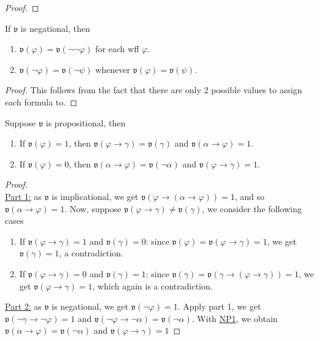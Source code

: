 \documentclass{treatise}
\begin{document}
\begin{shaded}
\begin{proof}
\end{proof}
\begin{proposition}
If $\mathfrak{v}$ is negational, then
\begin{enumerate}
    \item $\mathfrak{v}(\varphi) = \mathfrak{v}(\neg \neg \varphi)$ for each wff $\varphi$.
    \item $\mathfrak{v}(\neg \varphi) = \mathfrak{v}(\neg \psi)$ whenever $\mathfrak{v}(\varphi) = \mathfrak{v}(\psi)$.
\end{enumerate}
\end{proposition}
\begin{proof}
This follows from the fact that there are only 2 possible values to assign each formula to.
\end{proof}
\begin{lemma}
Suppose $\mathfrak{v}$ is propositional, then
\begin{enumerate}
    \item If $\mathfrak{v}(\varphi) = 1$, then $\mathfrak{v}(\varphi \to \gamma) = \mathfrak{v}(\gamma)$ and $\mathfrak{v}(\alpha \to \varphi) = 1$.
    \item If $\mathfrak{v}(\varphi) = 0$, then $\mathfrak{v}(\alpha \to \varphi) = \mathfrak{v}(\neg \alpha)$ and $\mathfrak{v}(\varphi \to \gamma) = 1$.
\end{enumerate}
\end{lemma}
\begin{proof} \ \\
\underline{Part 1:} as $\mathfrak{v}$ is implicational, we get $\mathfrak{v}(\varphi \to (\alpha \to \varphi)) = 1$, and so $\mathfrak{v}(\alpha \to \varphi) = 1$. Now, suppose $\mathfrak{v}(\varphi \to \gamma) \neq \mathfrak{v}(\gamma)$, we consider the following cases
\begin{enumerate}
    \item If $\mathfrak{v}(\varphi \to \gamma) = 1$ and $\mathfrak{v}(\gamma) = 0$: since $\mathfrak{v}(\varphi) = \mathfrak{v}(\varphi \to \gamma) = 1$, we get $\mathfrak{v}(\gamma) = 1$, a contradiction.
    \item If $\mathfrak{v}(\varphi \to \gamma) = 0$ and $\mathfrak{v}(\gamma) = 1$: since $\mathfrak{v}(\gamma) = \mathfrak{v}(\gamma \to (\varphi \to \gamma)) = 1$, we get $\mathfrak{v}(\varphi \to \gamma) = 1$, which again is a contradiction.
\end{enumerate}
\underline{Part 2:} as $\mathfrak{v}$ is negational, we get $\mathfrak{v}(\neg \varphi) = 1$. Apply part 1, we get $\mathfrak{v}(\neg\gamma \to \neg \varphi) = 1$ and $\mathfrak{v}(\neg \varphi \to \neg\alpha) = \mathfrak{v}(\neg\alpha)$. With \hyperref[HPL-A-NP1]{NP1}, we obtain $\mathfrak{v}(\alpha \to \varphi) = \mathfrak{v}(\neg \alpha)$ and $\mathfrak{v}(\varphi \to \gamma) = 1$

\end{proof}
\end{shaded}
\end{document}

